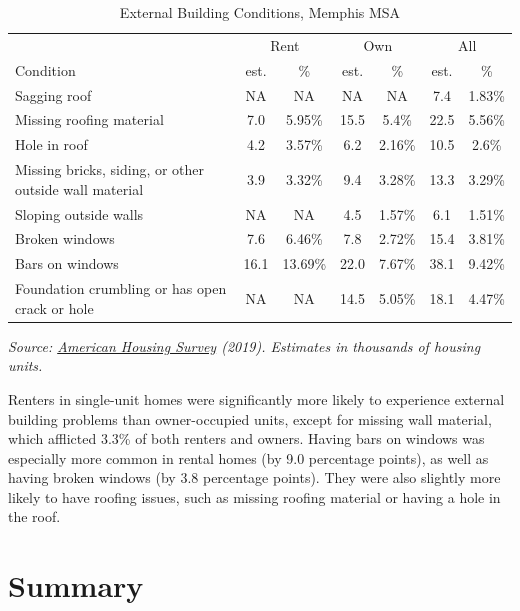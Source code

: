 \documentclass[
]{book}
\begin{document}
\begin{table}

\caption{\label{tab:unnamed-chunk-7}External Building Conditions, Memphis MSA}
\centering
\begin{tabular}[t]{l|c|c|c|c|c|c}
\hline
\multicolumn{1}{c|}{ } & \multicolumn{2}{c|}{Rent} & \multicolumn{2}{c|}{Own} & \multicolumn{2}{c}{All} \\
\cline{2-3} \cline{4-5} \cline{6-7}
Condition & est. & \% & est. & \% & est. & \%\\
\hline
Sagging roof & NA & NA & NA & NA & 7.4 & 1.83\%\\
\hline
Missing roofing material & 7.0 & 5.95\% & 15.5 & 5.4\% & 22.5 & 5.56\%\\
\hline
Hole in roof & 4.2 & 3.57\% & 6.2 & 2.16\% & 10.5 & 2.6\%\\
\hline
Missing bricks, siding, or other outside wall material & 3.9 & 3.32\% & 9.4 & 3.28\% & 13.3 & 3.29\%\\
\hline
Sloping outside walls & NA & NA & 4.5 & 1.57\% & 6.1 & 1.51\%\\
\hline
Broken windows & 7.6 & 6.46\% & 7.8 & 2.72\% & 15.4 & 3.81\%\\
\hline
Bars on windows & 16.1 & 13.69\% & 22.0 & 7.67\% & 38.1 & 9.42\%\\
\hline
Foundation crumbling or has open crack or hole & NA & NA & 14.5 & 5.05\% & 18.1 & 4.47\%\\
\hline
\end{tabular}
\end{table}

\emph{Source: \href{https://www.census.gov/newsroom/press-releases/2020/2019-american-housing-survey.html}{American Housing Survey} (2019). Estimates in thousands of housing units.}

Renters in single-unit homes were significantly more likely to experience external building problems than owner-occupied units, except for missing wall material, which afflicted 3.3\% of both renters and owners. Having bars on windows was especially more common in rental homes (by 9.0 percentage points), as well as having broken windows (by 3.8 percentage points). They were also slightly more likely to have roofing issues, such as missing roofing material or having a hole in the roof.

\hypertarget{summary}{%
\section{Summary}\label{summary}}
\end{document}
